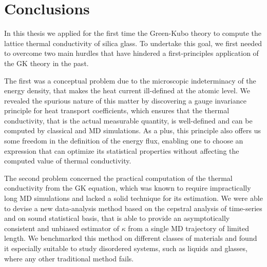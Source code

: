 \chapter{Conclusions}  \label{ch:conclusions}

In this thesis we applied for the first time the \abinitio Green-Kubo theory to compute the lattice thermal conductivity of silica glass. 
To undertake this goal, we first needed to overcome two main hurdles that have hindered a first-principles application of the GK theory in the past. 

The first was a conceptual problem due to the microscopic indeterminacy of the energy density, that makes the heat current ill-defined at the atomic level. 
We revealed the spurious nature of this matter by discovering a gauge invariance principle for heat transport coefficients, which ensures that the thermal conductivity, that is the actual measurable quantity, is well-defined and can be computed by classical and \abinitio MD simulations. 
As a plus, this principle also offers us some freedom in the definition of the energy flux, enabling one to choose an expression that can optimize its statistical properties without affecting the computed value of thermal conductivity. 

The second problem concerned the practical computation of the thermal conductivity from the GK equation, which was known to require impractically long MD simulations and lacked a solid technique for its estimation. 
We were able to devise a new data-analysis method based on the cepstral analysis of time-series and on sound statistical basis, that is able to provide an asymptotically consistent and unbiased estimator of $\kappa$ from a single MD trajectory of limited length. 
We benchmarked this method on different classes of materials and found it especially suitable to study disordered systems, such as liquids and glasses, where any other traditional method fails. 

